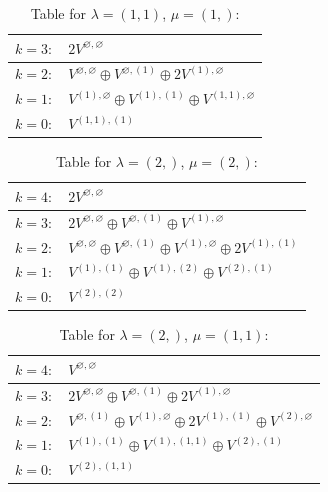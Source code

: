 \renewcommand{\arraystretch}{1.6} 
\begin{table}[H]
\centering
\caption{Table for $\lambda = (1, 1)$, $\mu = (1,)$:}
\begin{tabular}{|>{\centering\arraybackslash}p{15cm}|}
\hline
 $k = 3: \quad 2 V^{\varnothing, \varnothing} $ \\ \hline
 $k = 2: \quad V^{\varnothing, \varnothing} \oplus V^{\varnothing, (1)} \oplus 2 V^{(1), \varnothing} $ \\ \hline
 $k = 1: \quad V^{(1), \varnothing} \oplus V^{(1), (1)} \oplus V^{(1, 1), \varnothing} $ \\ \hline
 $k = 0: \quad V^{(1, 1), (1)} $ \\ \hline
\end{tabular}
\end{table}

\renewcommand{\arraystretch}{1.6} 
\begin{table}[H]
\centering
\caption{Table for $\lambda = (2,)$, $\mu = (2,)$:}
\begin{tabular}{|>{\centering\arraybackslash}p{15cm}|}
\hline
 $k = 4: \quad 2 V^{\varnothing, \varnothing} $ \\ \hline
 $k = 3: \quad 2 V^{\varnothing, \varnothing} \oplus V^{\varnothing, (1)} \oplus V^{(1), \varnothing} $ \\ \hline
 $k = 2: \quad V^{\varnothing, \varnothing} \oplus V^{\varnothing, (1)} \oplus V^{(1), \varnothing} \oplus 2 V^{(1), (1)} $ \\ \hline
 $k = 1: \quad V^{(1), (1)} \oplus V^{(1), (2)} \oplus V^{(2), (1)} $ \\ \hline
 $k = 0: \quad V^{(2), (2)} $ \\ \hline
\end{tabular}
\end{table}

\renewcommand{\arraystretch}{1.6} 
\begin{table}[H]
\centering
\caption{Table for $\lambda = (2,)$, $\mu = (1, 1)$:}
\begin{tabular}{|>{\centering\arraybackslash}p{15cm}|}
\hline
 $k = 4: \quad V^{\varnothing, \varnothing} $ \\ \hline
 $k = 3: \quad 2 V^{\varnothing, \varnothing} \oplus V^{\varnothing, (1)} \oplus 2 V^{(1), \varnothing} $ \\ \hline
 $k = 2: \quad V^{\varnothing, (1)} \oplus V^{(1), \varnothing} \oplus 2 V^{(1), (1)} \oplus V^{(2), \varnothing} $ \\ \hline
 $k = 1: \quad V^{(1), (1)} \oplus V^{(1), (1, 1)} \oplus V^{(2), (1)} $ \\ \hline
 $k = 0: \quad V^{(2), (1, 1)} $ \\ \hline
\end{tabular}
\end{table}

